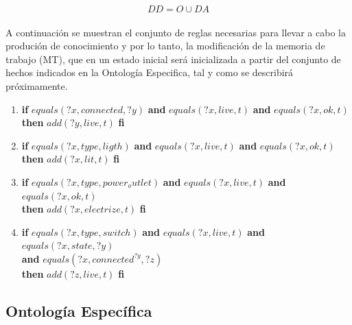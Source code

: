 \documentclass[10pt, a4paper,spanish]{article}
\begin{document}
			\begin{equation*}
				DD = O \cup DA
			\end{equation*}

			\paragraph{}
			A continuación se muestran el conjunto de reglas necesarias para llevar a cabo la produción de conocimiento y por lo tanto, la modificación de la memoria de trabajo (MT), que en un estado inicial será inicializada a partir del conjunto de hechos indicados en la Ontología Especifica, tal y como se describirá próximamente.

			\begin{enumerate}[label={\textbf{R\theenumi:}}]
				\item
					\textbf{if} $equals(?x, connected, ?y)$ \textbf{and} $equals(?x, live, t)$ \textbf{and} $equals(?x, ok, t)$ \\
					\textbf{then} $add(?y, live, t)$ \textbf{fi}

				\item
					\textbf{if} $equals(?x, type, ligth)$ \textbf{and} $equals(?x, live, t)$ \textbf{and} $equals(?x, ok, t)$ \\
					\textbf{then} $add(?x, lit, t)$ \textbf{fi}

				\item
					\textbf{if} $equals(?x, type, power_outlet)$ \textbf{and} $equals(?x, live, t)$ \textbf{and} $equals(?x, ok, t)$ \\
					\textbf{then} $add(?x, electrize, t)$ \textbf{fi}

				\item
					\textbf{if} $equals(?x, type, switch)$ \textbf{and} $equals(?x, live, t)$ \textbf{and} $equals(?x, state, ?y)$ \\
					\hspace*{0.5cm} \textbf{and} $equals(?x, connected^{?y}, ?z)$ \\
					\textbf{then} $add(?z, live, t)$ \textbf{fi}

			\end{enumerate}


		\subsection{Ontología Específica}
\end{document}
